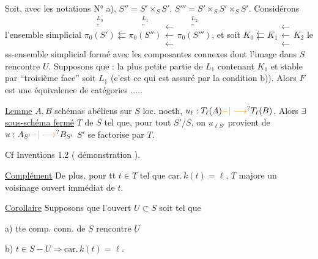  Soit, avec les notations   N° a), $S''=S'\times_S S'$, $S'''=S'\times_S S'\times_S S'$. Considérons l'ensemble simplicial $\overset{\substack{L_0\\\text{''}}}{\pi_0(S')}\leftleftarrows\overset{\substack{L_1\\\text{''}}}{\pi_0(S'')}\mathrel{\substack{\leftarrow\\[-.65ex]\leftarrow\\[-.65ex]\leftarrow}}\overset{\substack{L_2\\\text{''}}}{\pi_0(S''')}$,  et  soit $K_0\leftleftarrows K_1\mathrel{\substack{\leftarrow\\[-.65ex]\leftarrow\\[-.65ex]\leftarrow}} K_2$ le ss-ensemble simplicial formé avec les composantes connexes dont l'image dans $S$ rencontre $U$. Supposons \unsure{:} que :   la plus petite partie de $L_1$ contenant $K_1$ et stable par ``troisième face'' soit $L_1$ (c'est ce qui est assuré par la condition b)). Alors $F$ est  une équivalence de catégories .....


\uline{Lemme} $A,B$ schémas abéliens sur $S$ loc. noeth, $u_\ell:T_\ell(A)\unsure{-|\longrightarrow}T_\ell(B)$. Alors $\exists$ \uline{sous-schéma fermé} $T$ de $S$ tel que, pour tout $S'/S$, on  $u_{\ell S'}$ provient de $u:A_{S'}\unsure{-|\longrightarrow}B_{S'}$  $S'$ se factorise par $T$.

Cf Inventions 1.2 ( démonstration ).


\uline{Complément} De plus,  pour tt $t\in T$ tel que $\mathrm{car.}\,k(t)=\ell$, $T$ majore un voisinage ouvert immédiat de $t$.

\uline{Corollaire} Supposons que l'ouvert $U\subset S$ soit tel que

a) tte comp. conn. de $S$ rencontre $U$

b) $t\in S-U\Longrightarrow\mathrm{car.}\,k(t)=\ell$.

